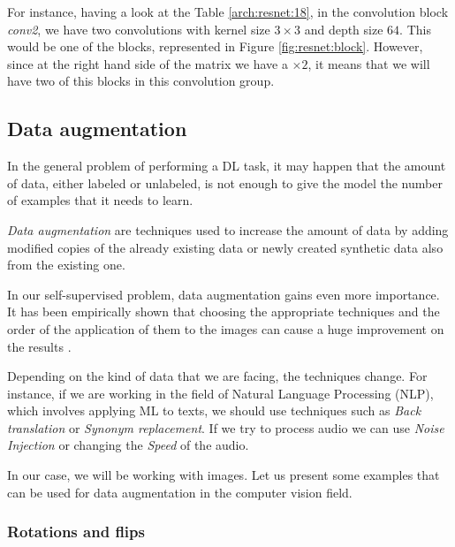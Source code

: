 For instance, having a look at the Table \ref{arch:resnet:18}, in the convolution block \emph{conv2}, we have two convolutions with kernel size $3\times 3$ and depth size $64$. This would be one of the blocks, represented in Figure \ref{fig:resnet:block}. However, since at the right hand side of the matrix we have a $\times 2$, it means that we will have two of this blocks in this convolution group.

\subsection{Data augmentation}

In the general problem of performing a DL task, it may happen that the amount of data, either labeled or unlabeled, is not enough to give the model the number of examples that it needs to learn. 

\begin{ndef}
\emph{Data augmentation} are techniques used to increase the amount of data by adding modified copies of the already existing data or newly created synthetic data also from the existing one. 
\end{ndef}

In our self-supervised problem, data augmentation gains even more importance. It has been empirically shown that choosing the appropriate techniques and the order of the application of them to the images can cause a huge improvement on the results \citep{chen_simple_2020}.

Depending on the kind of data that we are facing, the techniques change. For instance, if we are working in the field of Natural Language Processing (NLP), which involves applying ML to texts, we should use techniques such as \emph{Back translation} or \emph{Synonym replacement}. If we try to process audio we can use \emph{Noise Injection} or changing the \emph{Speed} of the audio.

In our case, we will be working with images. Let us present some examples that can be used for data augmentation in the computer vision field.

\subsubsection*{Rotations and flips}

